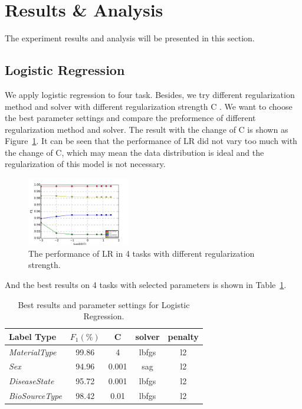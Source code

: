 \documentclass[sigconf]{acmart}
\begin{document}
\section{Results \& Analysis}
The experiment results and analysis will be presented in this section.


\subsection{Logistic Regression} 
We apply logistic regression to four task. Besides, we try different regularization method and solver  with different regularization strength C . We want to choose the best parameter settings and compare the preformence of different regularization method and solver. The result with the change of C is shown as Figure~\ref{lr_result1}. It can be seen that the performance of LR did not vary too much with the change of C, which may mean the data distribution is ideal and the  regularization of this model is not necessary.

\begin{figure}[!ht]
	\centering
	\includegraphics[width=0.4\textwidth]{../figs/LR_C.pdf}
	\caption{The performance of LR in 4 tasks with different regularization strength.}
	\label{lr_result1}
	\centering
\end{figure}

And the best results on 4 tasks with selected parameters is shown in Table~\ref{lr_result2}.

\begin{table}[tbp]
	\centering
	\begin{tabular}{l|cccc}
		\toprule
		{Label Type} & $F_1 (\%)$ & C &solver &penalty \\
		\midrule
		{\textit{MaterialType}}&99.86 & 4 &lbfgs & l2\\
		{\textit{Sex}}		& 94.96 & 0.001    &sag & l2 \\
		{\textit{DiseaseState}}& 95.72 & 0.001 &lbfgs & l2\\
		{\textit{BioSourceType}}& 98.42 & 0.01 &lbfgs & l2\\
		\bottomrule	
	\end{tabular}
	
	\caption{Best results and parameter settings for Logistic Regression. }
	\label{lr_result2}
\end{table}
\end{document}
